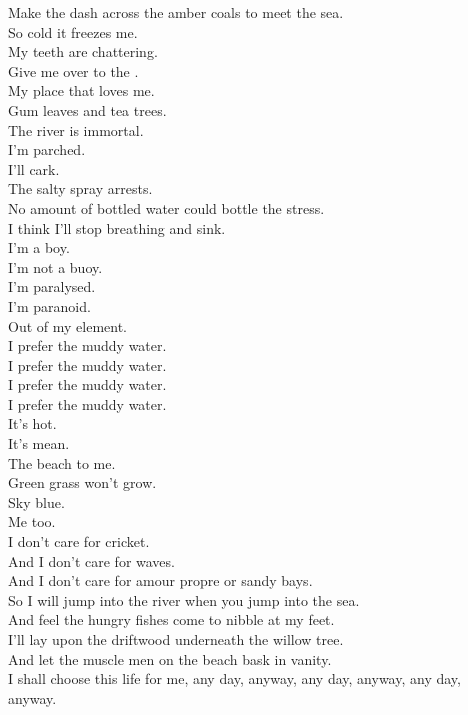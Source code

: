 Make the dash across the amber coals to meet the sea. \\
So cold it freezes me. \\
My teeth are chattering. \\
Give me over to the . \\
My place that loves me. \\
Gum leaves and tea trees. \\
The river is immortal. \\

I'm parched. \\
I'll cark. \\
The salty spray arrests. \\
No amount of bottled water could bottle the stress. \\
I think I'll stop breathing and sink. \\
I'm a boy. \\
I'm not a buoy. \\
I'm paralysed. \\
I'm paranoid. \\
Out of my element. \\

I prefer the muddy water. \\
I prefer the muddy water. \\
I prefer the muddy water. \\
I prefer the muddy water. \\

It's hot. \\
It's mean. \\
The beach to me. \\
Green grass won't grow. \\
Sky blue. \\
Me too. \\
I don't care for cricket. \\
And I don't care for waves. \\
And I don't care for amour propre or sandy bays. \\

So I will jump into the river when you jump into the sea. \\
And feel the hungry fishes come to nibble at my feet. \\
I'll lay upon the driftwood underneath the willow tree. \\
And let the muscle men on the beach bask in vanity. \\

I shall choose this life for me, any day, anyway, any day, anyway, any day, anyway. \\

